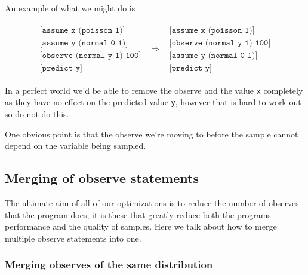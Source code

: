 \documentclass[a4paper]{article}
\newcommand{\optimization}[2]{
	\[
		\begin{array}{rcl}
			#1 & \Rightarrow & #2
		\end{array}
	\]
}
\begin{document}
An example of what we might do is
\optimization{
	\begin{array}{l}
		\texttt{[assume x (poisson 1)]} \\
		\texttt{[assume y (normal 0 1)]} \\
		\texttt{[observe (normal y 1) 100]} \\
		\texttt{[predict y] }
	\end{array}
}{
	\begin{array}{l}
		\texttt{[assume x (poisson 1)]} \\
		\texttt{[observe (normal y 1) 100]} \\
		\texttt{[assume y (normal 0 1)]} \\
		\texttt{[predict y] }
	\end{array}
}
In a perfect world we'd be able to remove the observe and the value \texttt{x} completely as they have no effect on the predicted value \texttt{y}, however that is hard to work out so do not do this.

One obvious point is that the observe we're moving to before the sample cannot depend on the variable being sampled.




\subsection{Merging of observe statements}

The ultimate aim of all of our optimizations is to reduce the number of observes that the program does, it is these that greatly reduce both the programs performance and the quality of samples. Here we talk about how to merge multiple observe statements into one.




\subsubsection{Merging observes of the same distribution}
\end{document}
